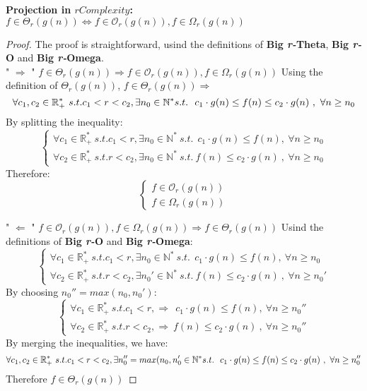  
\begin{theorem} 
  \textbf{Projection in $rComplexity$:}  \\  $ f \in \Theta_{r}(g(n)) \Leftrightarrow f \in \mathcal{O}_{r}(g(n)), f \in \Omega_{r}(g(n)) $
\end{theorem} 
\begin{proof} 
The proof is straightforward, usind the definitions of \textbf{Big \textit{r-}Theta}, \textbf{Big \textit{r-}O} and \textbf{Big \textit{r-}Omega}. \\
" $\Rightarrow$ " $ f \in \Theta_{r}(g(n)) \Rightarrow f \in \mathcal{O}_{r}(g(n)), f \in \Omega_{r}(g(n)) $
 Using the definition of $\Theta_{r}(g(n))$, $ f \in \Theta_{r}(g(n)) \Rightarrow$
  \[\forall c_{1}, c_{2} \in \mathbb{R}^{*}_{+} \ s.t.  c_{1} < r < c_{2} , \exists n_{0} \in \mathbb{N}^{*}\ \\ s.t.\ \ c_{1} \cdot g(n) \leq f(n) \leq c_{2} \cdot g(n)\ ,\  \forall n \geq n_{0} \]
  By splitting the inequality:
  \[\begin{cases} \forall c_{1} \in \mathbb{R}^{*}_{+} \ s.t.  c_{1} < r , \exists n_{0} \in \mathbb{N}^{*}\ s.t.\ \ c_{1} \cdot g(n) \leq f(n) ,\  \forall n \geq n_{0} \\ \forall  c_{2} \in \mathbb{R}^{*}_{+} \ s.t.  r < c_{2} , \exists n_{0} \in \mathbb{N}^{*}\ s.t.\ f(n) \leq c_{2} \cdot g(n)\ ,\  \forall n \geq n_{0} \end{cases}\]
  Therefore:
  \[\begin{cases} f \in \mathcal{O}_{r}(g(n)) \\ f \in \Omega_{r}(g(n)) \end{cases}\]
  
" $\Leftarrow$ " $ f \in \mathcal{O}_{r}(g(n)), f \in \Omega_{r}(g(n)) \Rightarrow f \in \Theta_{r}(g(n)) $
Usind the definitions of \textbf{Big \textit{r-}O} and \textbf{Big \textit{r-}Omega}: 
  \[\begin{cases} \forall c_{1} \in \mathbb{R}^{*}_{+} \ s.t.  c_{1} < r , \exists n_{0} \in \mathbb{N}^{*}\ s.t.\ \ c_{1} \cdot g(n) \leq f(n) ,\  \forall n \geq n_{0} \\ \forall  c_{2} \in \mathbb{R}^{*}_{+} \ s.t.  r < c_{2} , \exists n_{0}' \in \mathbb{N}^{*}\ s.t.\ f(n) \leq c_{2} \cdot g(n)\ ,\  \forall n \geq n_{0}' \end{cases}\]
By choosing $n_{0}'' = max(n_{0}, n_{0}')$:
  \[\begin{cases} \forall c_{1} \in \mathbb{R}^{*}_{+} \ s.t.  c_{1} < r ,\Rightarrow\ \ c_{1} \cdot g(n) \leq f(n) ,\  \forall n \geq n_{0}'' \\ \forall  c_{2} \in \mathbb{R}^{*}_{+} \ s.t.  r < c_{2} , \Rightarrow \ f(n) \leq c_{2} \cdot g(n)\ ,\  \forall n \geq n_{0}'' \end{cases}\]
By merging the inequalities, we have:
  \[\forall c_{1}, c_{2} \in \mathbb{R}^{*}_{+} \ s.t.  c_{1} < r < c_{2} , \exists n_{0}'' = max(n_{0}, n_{0}' \in \mathbb{N}^{*}\ \\ s.t.\ \ c_{1} \cdot g(n) \leq f(n) \leq c_{2} \cdot g(n)\ ,\  \forall n \geq n_{0}'' \]
Therefore $f \in \Theta_{r}(g(n))$
\end{proof} 


